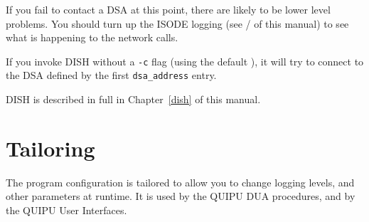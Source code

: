 If you fail to contact a DSA at this point, there are likely to be lower
level problems. You should turn up the ISODE logging 
(see \voltwo/ of this manual) to see what is happening to the 
network calls.

If you invoke DISH without a \verb"-c" flag (using the default ), it will 
try to connect to the DSA defined by the first
\verb"dsa_address" entry.

DISH is described in full in Chapter~\ref{dish} 
of this manual.

\section{Tailoring}
\label{dua:tailor}

The program configuration is tailored to
allow you to change logging levels, and other parameters at
runtime.  
It is used by the QUIPU DUA procedures, and by the QUIPU User Interfaces.

